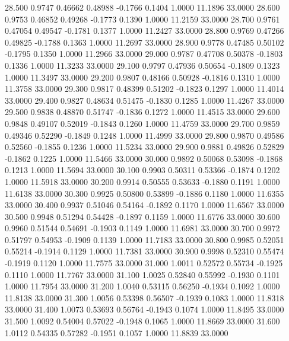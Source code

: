   28.500   0.9747   0.46662   0.48988  -0.1766   0.1404   1.0000  11.1896  33.0000
  28.600   0.9753   0.46852   0.49268  -0.1773   0.1390   1.0000  11.2159  33.0000
  28.700   0.9761   0.47054   0.49547  -0.1781   0.1377   1.0000  11.2427  33.0000
  28.800   0.9769   0.47266   0.49825  -0.1788   0.1363   1.0000  11.2697  33.0000
  28.900   0.9778   0.47485   0.50102  -0.1795   0.1350   1.0000  11.2966  33.0000
  29.000   0.9787   0.47708   0.50378  -0.1803   0.1336   1.0000  11.3233  33.0000
  29.100   0.9797   0.47936   0.50654  -0.1809   0.1323   1.0000  11.3497  33.0000
  29.200   0.9807   0.48166   0.50928  -0.1816   0.1310   1.0000  11.3758  33.0000
  29.300   0.9817   0.48399   0.51202  -0.1823   0.1297   1.0000  11.4014  33.0000
  29.400   0.9827   0.48634   0.51475  -0.1830   0.1285   1.0000  11.4267  33.0000
  29.500   0.9838   0.48870   0.51747  -0.1836   0.1272   1.0000  11.4515  33.0000
  29.600   0.9848   0.49107   0.52019  -0.1843   0.1260   1.0000  11.4759  33.0000
  29.700   0.9859   0.49346   0.52290  -0.1849   0.1248   1.0000  11.4999  33.0000
  29.800   0.9870   0.49586   0.52560  -0.1855   0.1236   1.0000  11.5234  33.0000
  29.900   0.9881   0.49826   0.52829  -0.1862   0.1225   1.0000  11.5466  33.0000
  30.000   0.9892   0.50068   0.53098  -0.1868   0.1213   1.0000  11.5694  33.0000
  30.100   0.9903   0.50311   0.53366  -0.1874   0.1202   1.0000  11.5918  33.0000
  30.200   0.9914   0.50555   0.53633  -0.1880   0.1191   1.0000  11.6138  33.0000
  30.300   0.9925   0.50800   0.53899  -0.1886   0.1180   1.0000  11.6355  33.0000
  30.400   0.9937   0.51046   0.54164  -0.1892   0.1170   1.0000  11.6567  33.0000
  30.500   0.9948   0.51294   0.54428  -0.1897   0.1159   1.0000  11.6776  33.0000
  30.600   0.9960   0.51544   0.54691  -0.1903   0.1149   1.0000  11.6981  33.0000
  30.700   0.9972   0.51797   0.54953  -0.1909   0.1139   1.0000  11.7183  33.0000
  30.800   0.9985   0.52051   0.55214  -0.1914   0.1129   1.0000  11.7381  33.0000
  30.900   0.9998   0.52310   0.55474  -0.1919   0.1120   1.0000  11.7575  33.0000
  31.000   1.0011   0.52572   0.55734  -0.1925   0.1110   1.0000  11.7767  33.0000
  31.100   1.0025   0.52840   0.55992  -0.1930   0.1101   1.0000  11.7954  33.0000
  31.200   1.0040   0.53115   0.56250  -0.1934   0.1092   1.0000  11.8138  33.0000
  31.300   1.0056   0.53398   0.56507  -0.1939   0.1083   1.0000  11.8318  33.0000
  31.400   1.0073   0.53693   0.56764  -0.1943   0.1074   1.0000  11.8495  33.0000
  31.500   1.0092   0.54004   0.57022  -0.1948   0.1065   1.0000  11.8669  33.0000
  31.600   1.0112   0.54335   0.57282  -0.1951   0.1057   1.0000  11.8839  33.0000
